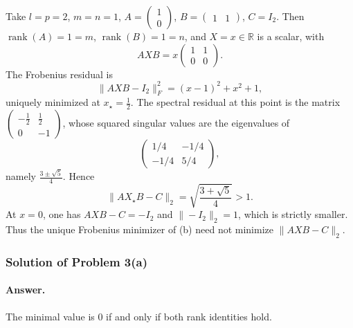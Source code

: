 \documentclass[11pt,a4paper]{article}
\DeclareMathOperator{\rank}{rank}
\begin{document}
\begin{example}
\label{ex:p3-spectral}
Take \(l=p=2\), \(m=n=1\), \(A=\begin{pmatrix}1\\0\end{pmatrix}\), \(B=\begin{pmatrix}1&1\end{pmatrix}\), \(C=I_{2}\). Then \(\rank(A)=1=m\), \(\rank(B)=1=n\), and \(X=x\in\mathbb{R}\) is a scalar, with
\[
AXB
=
x
\begin{pmatrix}1&1\\0&0\end{pmatrix}.
\]
The Frobenius residual is
\[
\|AXB-I_{2}\|_{F}^{2}
=
(x-1)^{2}+x^{2}+1,
\]
uniquely minimized at \(x_{\star}=\tfrac12\). The spectral residual at this point is the matrix \(\begin{pmatrix}-\tfrac12&\tfrac12\\0&-1\end{pmatrix}\), whose squared singular values are the eigenvalues of
\[
\begin{pmatrix}1/4&-1/4\\-1/4&5/4\end{pmatrix},
\]
namely \(\frac{3\pm\sqrt{5}}{4}\). Hence
\[
\|AX_{\star}B-C\|_{2}
=
\sqrt{\frac{3+\sqrt{5}}{4}}
>
1.
\]
At \(x=0\), one has \(AXB-C=-I_{2}\) and \(\|-I_{2}\|_{2}=1\), which is strictly smaller. Thus the unique Frobenius minimizer of (b) need not minimize \(\|AXB-C\|_{2}\).
\end{example}

\subsubsection{Solution of Problem 3(a)}

\paragraph{Answer.}
The minimal value is \(0\) if and only if both rank identities hold.
\end{document}
